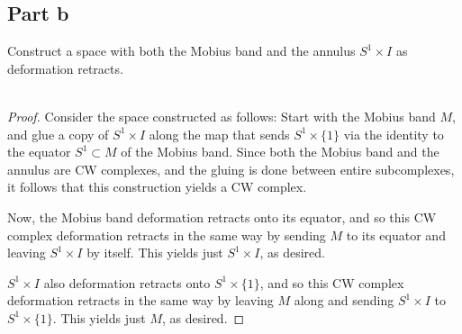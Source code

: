 \documentclass[fontsize=11pt]{scrartcl} %
\numberwithin{equation}{section} %
\numberwithin{figure}{section} %
\numberwithin{table}{section} %
\begin{document}
\subsection*{Part b}
Construct a space with both the Mobius band and the annulus $S^1\times I$ as
deformation retracts.
\\
\\
\begin{proof}
    Consider the space constructed as follows:
    Start with the Mobius band $M$, and glue a copy of $S^1\times I$ along the map
    that sends $S^1\times \{1\}$ via the identity to the equator $S^1\subset M$ of the
    Mobius band. Since both the Mobius band and the annulus are CW complexes,
    and the gluing is done between entire subcomplexes, it follows that this
    construction yields a CW complex.

    Now, the Mobius band deformation retracts onto its equator, and so this CW
    complex deformation retracts in the same way by sending $M$ to its equator
    and leaving $S^1\times I$ by itself. This yields just $S^1\times I$, as
    desired.

    $S^1\times I$ also deformation retracts onto $S^1\times \{1\}$, and so this
    CW complex deformation retracts in the same way by leaving $M$ along and
    sending $S^1\times I$ to $S^1\times \{1\}$. This yields just $M$, as
    desired.
\end{proof}
\end{document}
